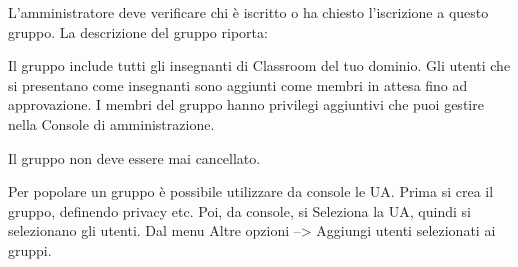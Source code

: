 L'amministratore deve verificare chi è iscritto o ha chiesto l'iscrizione a questo gruppo. La descrizione del gruppo riporta:

	Il gruppo include tutti gli insegnanti di Classroom del tuo dominio. Gli utenti che si presentano come insegnanti sono aggiunti come membri in attesa fino ad approvazione. I membri del gruppo hanno privilegi aggiuntivi che puoi gestire nella Console di amministrazione.

Il gruppo non deve essere mai cancellato.

Per popolare un gruppo è possibile utilizzare da console le UA. Prima si crea il gruppo, definendo privacy etc. Poi, da console, si Seleziona la UA, quindi si selezionano gli utenti. Dal menu Altre opzioni --> Aggiungi utenti selezionati ai gruppi. 

